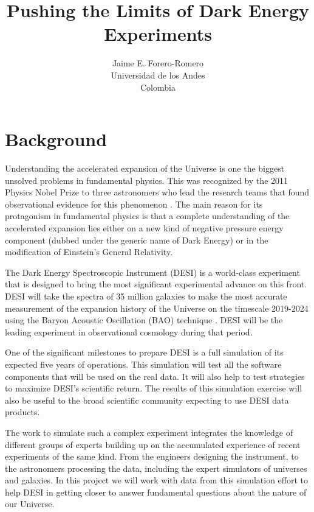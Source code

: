 \documentclass[12pt]{article}
\title{Pushing the Limits of Dark Energy Experiments}
\author{Jaime E. Forero-Romero\\Universidad de los Andes\\Colombia}
\begin{document}
\maketitle
\pagestyle{empty}
\pagestyle{fancy}
\section*{Background}

Understanding the accelerated expansion of the Universe is one the
biggest unsolved problems in fundamental physics.  
This was recognized by the 2011 Physics Nobel Prize to three
astronomers who lead the research teams that found observational evidence for
this phenomenon \cite{1998AJ....116.1009R,1999ApJ...517..565P}.  
The main reason for its protagonism in fundamental physics is that a
complete understanding of the accelerated expansion lies either on a
new kind of negative pressure energy component (dubbed under the
generic name of Dark Energy) or in the modification of Einstein's
General Relativity.   

The Dark Energy Spectroscopic Instrument (DESI) is a world-class
experiment that is designed to bring the most significant experimental
advance on this front. 
DESI will take the spectra of 35 million galaxies to make the most
accurate measurement of the expansion history of the Universe on the
timescale 2019-2024 using the Baryon Acoustic Oscillation (BAO) technique
\cite{2005ApJ...633..560E,2005MNRAS.362..505C}.    
DESI will be the leading experiment in observational cosmology during
that period.  

One of the significant milestones to prepare DESI is a full simulation
of its expected five years of operations. 
This simulation will test all the software components that will be used on
the real data. It will also help to test strategies to  maximize
DESI's scientific return.   
The results of this simulation exercise will also be useful to the
broad scientific community expecting to use DESI data products. 
 
The work to simulate such a complex experiment integrates the knowledge of
different groups of experts \cite{2016A&C....15....1N} building up on
the accumulated experience of recent experiments of the same
kind\cite{2013AJ....145...10D}.  
From the engineers designing   the instrument, to the astronomers
processing the data, including the expert simulators of universes and
galaxies. 
In this project we will work with data from this simulation effort to
help DESI in getting closer to answer fundamental questions about
the nature of our Universe.  
\end{document}
